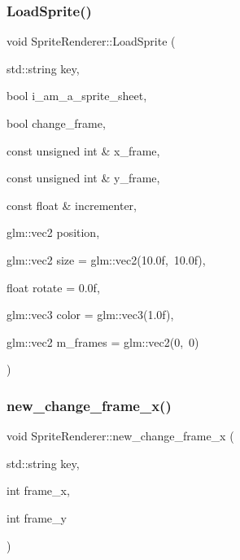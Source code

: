 \mbox{\label{classSpriteRenderer_ab3e76fbe6cbb4ff8be6858cd843dee6c}} 
\subsubsection{\texorpdfstring{Load\+Sprite()}{LoadSprite()}}
{\footnotesize\ttfamily void Sprite\+Renderer\+::\+Load\+Sprite (\begin{DoxyParamCaption}\item[{std\+::string}]{key,  }\item[{bool}]{i\+\_\+am\+\_\+a\+\_\+sprite\+\_\+sheet,  }\item[{bool}]{change\+\_\+frame,  }\item[{const unsigned int \&}]{x\+\_\+frame,  }\item[{const unsigned int \&}]{y\+\_\+frame,  }\item[{const float \&}]{incrementer,  }\item[{glm\+::vec2}]{position,  }\item[{glm\+::vec2}]{size = {\ttfamily glm\+:\+:vec2(10.0f,~10.0f)},  }\item[{float}]{rotate = {\ttfamily 0.0f},  }\item[{glm\+::vec3}]{color = {\ttfamily glm\+:\+:vec3(1.0f)},  }\item[{glm\+::vec2}]{m\+\_\+frames = {\ttfamily glm\+:\+:vec2(0,~0)} }\end{DoxyParamCaption})}

\mbox{\label{classSpriteRenderer_aec4b432ac6c814cf7ccfe4ca775d7b1f}} 
\subsubsection{\texorpdfstring{new\+\_\+change\+\_\+frame\+\_\+x()}{new\_change\_frame\_x()}}
{\footnotesize\ttfamily void Sprite\+Renderer\+::new\+\_\+change\+\_\+frame\+\_\+x (\begin{DoxyParamCaption}\item[{std\+::string}]{key,  }\item[{int}]{frame\+\_\+x,  }\item[{int}]{frame\+\_\+y }\end{DoxyParamCaption})\hspace{0.3cm}{\ttfamily [inline]}}


